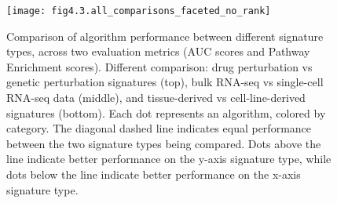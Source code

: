 \begin{figure}[htbp]
    \centering
    \texttt{[image: fig4.3.all\_comparisons\_faceted\_no\_rank]}
    \caption[Comparison of algorithm performance between different signature types.]{Comparison of algorithm performance between different signature types, across two evaluation metrics (AUC scores and Pathway Enrichment scores). Different comparison: drug perturbation vs genetic perturbation signatures (top), bulk RNA-seq vs single-cell RNA-seq data (middle), and tissue-derived vs cell-line-derived signatures (bottom). Each dot represents an algorithm, colored by category. The diagonal dashed line indicates equal performance between the two signature types being compared. Dots above the line indicate better performance on the y-axis signature type, while dots below the line indicate better performance on the x-axis signature type.}
    \label{fig:fig4.3.all_comparisons_faceted_no_rank}
\end{figure}
